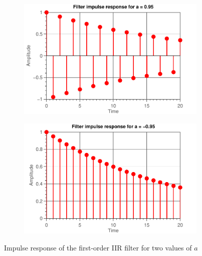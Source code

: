 \documentclass[11pt,titlepage]{report}
\begin{document}
\begin{figure}[H]
	\centering
	\begin{subfigure}{0.49\textwidth}
		\includegraphics[width=\textwidth]{../../deliverable-7-resources/figures/ass-1/report-2/ass-1-report-2-a-positive.pdf}
	\end{subfigure}
	\begin{subfigure}{0.49\textwidth}
		\includegraphics[width=\textwidth]{../../deliverable-7-resources/figures/ass-1/report-2/ass-1-report-2-a-negative.pdf}
	\end{subfigure}
	\caption{Impulse response of the first-order IIR filter for two values of $a$}
	\label{fig:ass-1-rep-2-time}
\end{figure}
\end{document}
